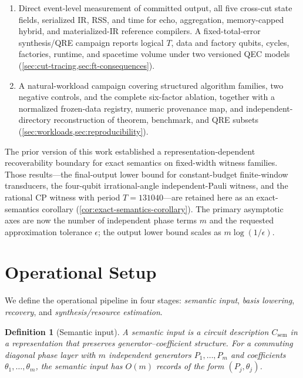 \documentclass[aps,prx,reprint,floatfix,superscriptaddress]{revtex4-2}
\newtheorem{definition}{Definition}
\begin{document}
\begin{enumerate}[leftmargin=1.5em]
    aggregation certificates, and conservative fallback, evaluated on a
    complete nine-representation by five-compiler matrix and a separately
    versioned campaign of local, semantic-capable, and authors-reference
    baselines.  Bridge loss and non-completion statuses are reported separately
    (\cref{sec:compiler,sec:validation}).
    \item Direct event-level measurement of committed output, all five
    cross-cut state fields, serialized IR, RSS, and time for echo, aggregation,
    memory-capped hybrid, and materialized-IR reference compilers.  A
    fixed-total-error synthesis/QRE campaign reports logical $T$, data and
    factory qubits, cycles, factories, runtime, and spacetime volume under two
    versioned QEC models (\cref{sec:cut-tracing,sec:ft-consequences}).
    \item A natural-workload campaign covering structured algorithm families,
    two negative controls, and the complete six-factor ablation, together with
    a normalized frozen-data registry, numeric provenance map, and
    independent-directory reconstruction of theorem, benchmark, and QRE
    subsets (\cref{sec:workloads,sec:reproducibility}).
\end{enumerate}

The prior version of this work established a
representation-dependent recoverability boundary for exact semantics on
fixed-width witness families. Those results---the final-output lower
bound for constant-budget finite-window transducers, the four-qubit
irrational-angle independent-Pauli witness, and the rational CP witness
with period $T=131040$---are retained here as an exact-semantics
corollary (\cref{cor:exact-semantics-corollary}). The primary asymptotic
axes are now the number of independent phase terms $m$ and the requested
approximation tolerance $\epsilon$; the output lower bound scales as
$m\log(1/\epsilon)$.


\section{Operational Setup}
\label{sec:setup}

We define the operational pipeline in four stages:
\emph{semantic input}, \emph{basis lowering}, \emph{recovery}, and
\emph{synthesis/resource estimation}.

\begin{definition}[Semantic input]
\label{def:semantic-input}
A semantic input is a circuit description $C_{\mathrm{sem}}$ in a
representation that preserves generator--coefficient structure. For a
commuting diagonal phase layer with $m$ independent generators
$P_1,\ldots,P_m$ and coefficients $\theta_1,\ldots,\theta_m$, the semantic
input has $O(m)$ records of the form $(P_j, \theta_j)$.
\end{definition}
\end{document}
